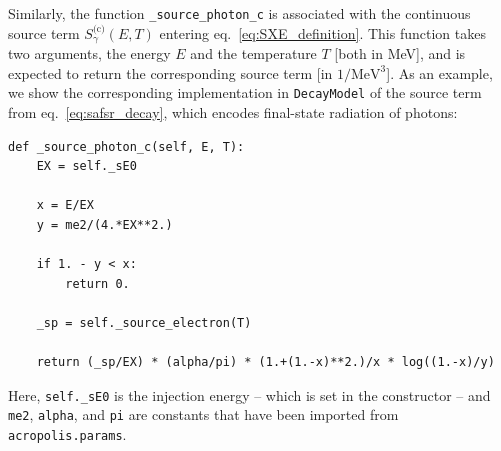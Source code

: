 \documentclass[11pt,a4paper]{article}
\begin{document}
Similarly, the function \texttt{\_source\_photon\_c} is associated with the continuous source term $S_\gamma^\text{(c)}(E, T)$ entering eq.~\eqref{eq:SXE_definition}. This function takes two arguments, the energy $E$ and the temperature $T$ [both in MeV], and is expected to return the corresponding source term [in $1/\mathrm{MeV}^3$]. As an example, we show the corresponding implementation in \texttt{DecayModel} of the source term from eq.~\eqref{eq:safsr_decay}, which encodes final-state radiation of photons:
\begin{lstlisting}
def _source_photon_c(self, E, T):
	EX = self._sE0

	x = E/EX
	y = me2/(4.*EX**2.)

	if 1. - y < x:
		return 0.

	_sp = self._source_electron(T)

	return (_sp/EX) * (alpha/pi) * (1.+(1.-x)**2.)/x * log((1.-x)/y)
\end{lstlisting}
Here, \texttt{self.\_sE0} is the injection energy -- which is set in the constructor -- and \texttt{me2}, \texttt{alpha}, and \texttt{pi} are constants that have been imported from \texttt{acropolis.params}.
\end{document}
